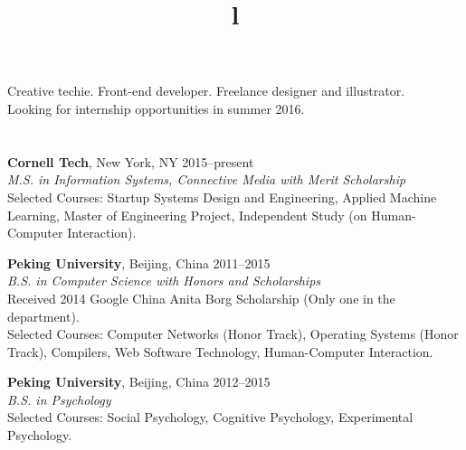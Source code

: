 \begin{resume}

\vspace{25pt}

\section{}

Creative techie. Front-end developer. Freelance designer and illustrator. \\
Looking for internship opportunities in summer 2016.


\section{}

\textbf{Cornell Tech}, New York, NY \hfill 2015--present \\
\textsl{M.S. in Information Systems, Connective Media with Merit Scholarship} \\
Selected Courses: Startup Systems Design and Engineering, Applied Machine Learning, Master of Engineering Project, Independent Study (on Human-Computer Interaction).

\textbf{Peking University}, Beijing, China \hfill 2011--2015 \\ 
\textsl{B.S. in Computer Science with Honors and Scholarships}\\
Received 2014 Google China Anita Borg Scholarship (Only one in the department). \\
Selected Courses: Computer Networks (Honor Track), Operating Systems (Honor Track), Compilers, Web Software Technology, Human-Computer Interaction.

\textbf{Peking University}, Beijing, China \hfill 2012--2015 \\ 
\textsl{B.S. in Psychology}\\
Selected Courses: Social Psychology, Cognitive Psychology, Experimental Psychology.

\begin{formatb}
  \\
  \title{l}\\
  \body\\
\end{formatb}


\section{}


\end{resume}
